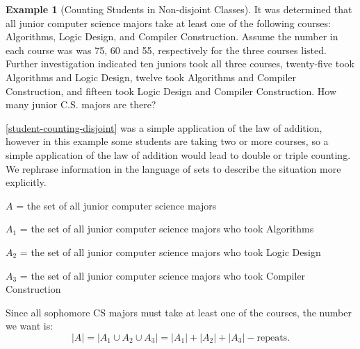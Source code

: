 \documentclass[10pt,]{book}
\theoremstyle{plain}
\theoremstyle{definition}
\theoremstyle{definition}
\newtheorem{example}[theorem]{Example}
\theoremstyle{definition}
\begin{document}
\begin{example}[Counting Students in Non-disjoint Classes]\label{student-counting-nondisjoint}
It was determined that all junior computer science majors take at least one of the following courses: Algorithms, Logic Design, and Compiler Construction. Assume the number in each course was was 75, 60 and 55, respectively for the three courses listed. Further investigation indicated ten juniors took all three courses, twenty-five took  Algorithms and Logic Design, twelve took Algorithms and Compiler Construction, and fifteen took Logic Design and Compiler Construction. How many junior C.S. majors are there?
%
\par
\hyperref[student-counting-disjoint]{\ref{student-counting-disjoint}} was a simple application of the law of addition, however in this example some students are taking two or more courses, so a simple application of the law of addition would lead to double or triple counting. We rephrase information in the language of sets to describe the situation more explicitly.
%
\par

 \(A\) = the set of all junior computer science majors
%
\par

  \(A_1\) = the set of all junior computer science majors who took Algorithms
%
\par

  \(A_2\) = the set of all junior computer science majors who took Logic Design
%
\par

  \(A_3\) = the set of all junior computer science majors who took Compiler Construction
%
\par

 Since all sophomore CS majors must take at least one of the courses, the number we want is:
 \begin{equation*}\lvert A \rvert = \lvert A_1 \cup A_2 \cup A_3 \rvert = \lvert A_1 \rvert + \lvert A_2 \rvert + \lvert A_3 \rvert - \textrm{repeats}.\end{equation*}
%
\par


\end{example}
\end{document}
